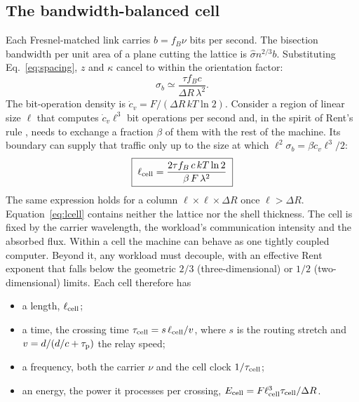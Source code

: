\documentclass[final,5p]{elsarticle}
\newcommand{\kTl}{kT\ln 2}
\newcommand{\lcell}{\ell_{\rm cell}}
\begin{document}
\subsection{The bandwidth-balanced cell}
Each Fresnel-matched link carries $b=f_B\nu$ bits per second. The bisection bandwidth per unit area of a plane cutting the lattice is $\hat\sigma n^{2/3}b$. Substituting Eq.~\eqref{eq:spacing}, $z$ and $\kappa$ cancel to within the orientation factor:
\begin{equation}
\sigma_b \simeq \frac{\tau f_B c}{\Delta R\,\lambda^2}.
\end{equation}
The bit-operation density is $\dot c_v = F/(\Delta R\,\kTl)$. Consider a region of linear size $\ell$ that computes $\dot c_v\ell^3$ bit operations per second and, in the spirit of Rent's rule \citep{Landman1971,Christie2000}, needs to exchange a fraction $\beta$ of them with the rest of the machine. Its boundary can supply that traffic only up to the size at which $\ell^2\sigma_b=\beta\dot c_v\ell^3/2$:
\begin{equation}
\boxed{\;\lcell = \frac{2\tau f_B\,c\,\kTl}{\beta\,F\,\lambda^2}\;}
\label{eq:lcell}
\end{equation}
The same expression holds for a column $\ell\times\ell\times\Delta R$ once $\ell>\Delta R$. Equation~\eqref{eq:lcell} contains neither the lattice nor the shell thickness. The cell is fixed by the carrier wavelength, the workload's communication intensity and the absorbed flux. Within a cell the machine can behave as one tightly coupled computer. Beyond it, any workload must decouple, with an effective Rent exponent that falls below the geometric $2/3$ (three-dimensional) or $1/2$ (two-dimensional) limits. Each cell therefore has
\begin{itemize}
\item a length, $\lcell$;
\item a time, the crossing time $\tau_{\rm cell}=s\,\lcell/v$, where $s$ is the routing stretch and $v=d/(d/c+\tau_{\rm p})$ the relay speed;
\item a frequency, both the carrier $\nu$ and the cell clock $1/\tau_{\rm cell}$;
\item an energy, the power it processes per crossing, $E_{\rm cell}=F\lcell^3\tau_{\rm cell}/\Delta R$.
\end{itemize}
\end{document}
